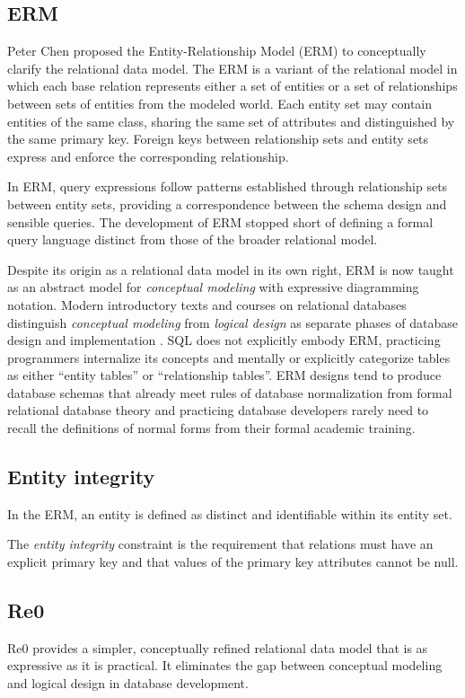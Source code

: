 \documentclass[letter,10pt]{article}
\begin{document}
\subsection{ERM}
Peter Chen \citep{chen_entity_1976} proposed the Entity-Relationship Model (ERM) to conceptually clarify the relational data model.
The ERM is a variant of the relational model in which each base relation represents either a set of entities or a set of relationships between sets of entities from the modeled world. 
Each entity set may contain entities of the same class, sharing the same set of attributes and distinguished by the same  primary key.
Foreign keys between relationship sets and entity sets express and enforce the corresponding relationship.

In ERM, query expressions follow patterns established through relationship sets between entity sets, providing a correspondence between the schema design and sensible queries. 
The development of ERM stopped short of defining a formal query language distinct from those of the broader relational model.

Despite its origin as a relational data model in its own right, ERM is now taught as an abstract model for \emph{conceptual modeling} with expressive diagramming notation.  
Modern introductory texts and courses on relational databases distinguish \emph{conceptual modeling} from \emph{logical design} as separate phases of database design and implementation \citep{elmasri-2015-fundamentals, coronel-2016-database}.
SQL does not explicitly embody ERM, practicing programmers internalize its concepts and  mentally or explicitly categorize tables as either ``entity tables'' or ``relationship tables''.  
ERM designs tend to produce database schemas that already  meet rules of database normalization from formal relational database theory and practicing database developers rarely need to recall the definitions of normal forms from their formal academic training.

\subsection{Entity integrity}
In the ERM, an entity is defined as distinct and identifiable within its entity set. 

The \emph{entity integrity} constraint is the requirement that relations must have an explicit primary key and that values of the primary key attributes cannot be null. 

\subsection{Re0}
Re0 provides a simpler, conceptually refined relational data model that is as expressive as it is practical. 
It eliminates the gap between conceptual modeling and logical design in database development.
\end{document}
